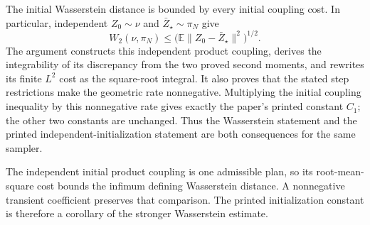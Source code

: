 \documentclass[11pt,a4paper]{article}
\begin{document}
The initial Wasserstein distance is bounded by every initial coupling cost. In particular, independent \(Z_0\sim\nu\) and \(\bar Z_\star\sim\pi_N\) give \[W_2(\nu,\pi_N)\le\bigl(\mathbb E\|Z_0-\bar Z_\star\|^2\bigr)^{1/2}.\] The argument constructs this independent product coupling, derives the integrability of its discrepancy from the two proved second moments, and rewrites its finite \(L^{2}\) cost as the square-root integral. It also proves that the stated step restrictions make the geometric rate nonnegative. Multiplying the initial coupling inequality by this nonnegative rate gives exactly the paper’s printed constant \(C_1\); the other two constants are unchanged. Thus the Wasserstein statement and the printed independent-initialization statement are both consequences for the same sampler.



The independent initial product coupling is one admissible plan, so its root-mean-square cost bounds the infimum defining Wasserstein distance. A nonnegative transient coefficient preserves that comparison. The printed initialization constant is therefore a corollary of the stronger Wasserstein estimate.
\end{document}
